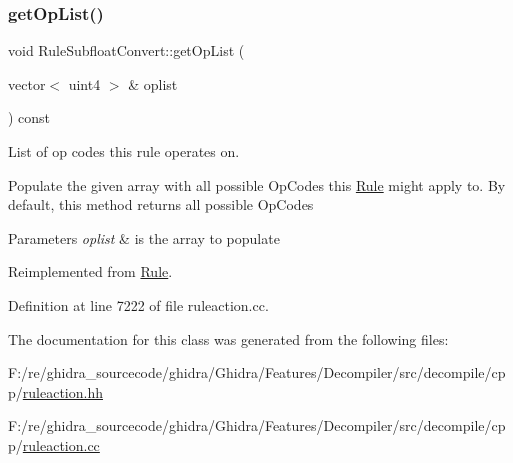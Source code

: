 \subsubsection{\texorpdfstring{getOpList()}{getOpList()}}
{\footnotesize\ttfamily void Rule\+Subfloat\+Convert\+::get\+Op\+List (\begin{DoxyParamCaption}\item[{vector$<$ uint4 $>$ \&}]{oplist }\end{DoxyParamCaption}) const\hspace{0.3cm}{\ttfamily [virtual]}}



List of op codes this rule operates on. 

Populate the given array with all possible Op\+Codes this \mbox{\hyperlink{class_rule}{Rule}} might apply to. By default, this method returns all possible Op\+Codes 
\begin{DoxyParams}{Parameters}
{\em oplist} & is the array to populate \\
\hline
\end{DoxyParams}


Reimplemented from \mbox{\hyperlink{class_rule_a4023bfc7825de0ab866790551856d10e}{Rule}}.



Definition at line 7222 of file ruleaction.\+cc.



The documentation for this class was generated from the following files\+:\begin{DoxyCompactItemize}
\item 
F\+:/re/ghidra\+\_\+sourcecode/ghidra/\+Ghidra/\+Features/\+Decompiler/src/decompile/cpp/\mbox{\hyperlink{ruleaction_8hh}{ruleaction.\+hh}}\item 
F\+:/re/ghidra\+\_\+sourcecode/ghidra/\+Ghidra/\+Features/\+Decompiler/src/decompile/cpp/\mbox{\hyperlink{ruleaction_8cc}{ruleaction.\+cc}}\end{DoxyCompactItemize}
